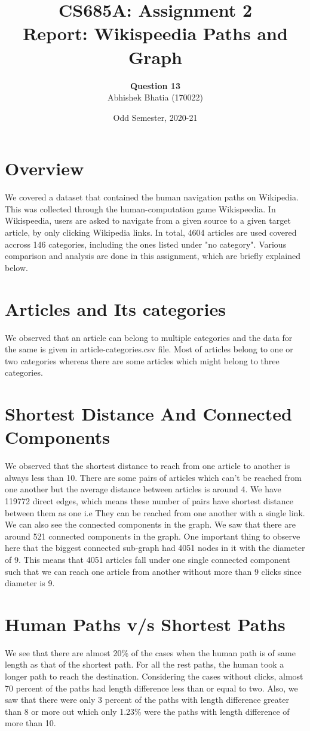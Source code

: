\documentclass[11pt]{article}
\title{CS685A: Assignment 2\\Report: Wikispeedia Paths and Graph}
\author{\textbf{Question 13}\\
Abhishek Bhatia (170022)}
\date{Odd Semester, 2020-21}
\begin{document}
\maketitle

\section{Overview}
We covered a dataset that contained the human navigation paths on Wikipedia. This was collected through the human-computation game Wikispeedia. In Wikispeedia, users are asked to navigate from a given source to a given target article, by only clicking Wikipedia links. In total, 4604 articles are used covered accross 146 categories, including the ones listed under "no category". Various comparison and analysis are done in this assignment, which are briefly explained below.
\noindent 

\section{Articles and Its categories}

We observed that an article can belong to multiple categories and the data for the same is given in article-categories.csv file. Most of articles belong to one or two categories whereas there are some articles which might belong to three categories.

\section{Shortest Distance And Connected Components}
We observed that the shortest distance to reach from one article to another is always less than 10. There are some pairs of articles which can't be reached from one another but the average distance between articles is around 4. We have 119772 direct edges, which means these number of pairs have shortest distance between them as one i.e They can be reached from one another with a single link. \\
We can also see the connected components in the graph. We saw that there are around 521 connected components in the graph. One important thing to observe here that the biggest connected sub-graph had 4051 nodes in it with the diameter of 9. This means that 4051 articles fall under one single connected component such that we can reach one article from another without more than 9 clicks since diameter is 9.

\section{Human Paths v/s Shortest Paths}
We see that there are almost 20\% of the cases when the human path is of same length as that of the shortest path. For all the rest paths, the human took a longer path to reach the destination. Considering the cases without clicks, almost 70 percent of the paths had length difference less than or equal to two. Also, we saw that there were only 3 percent of the paths with length difference greater than 8 or more out which only 1.23\% were the paths with length difference of more than 10.
\end{document}
